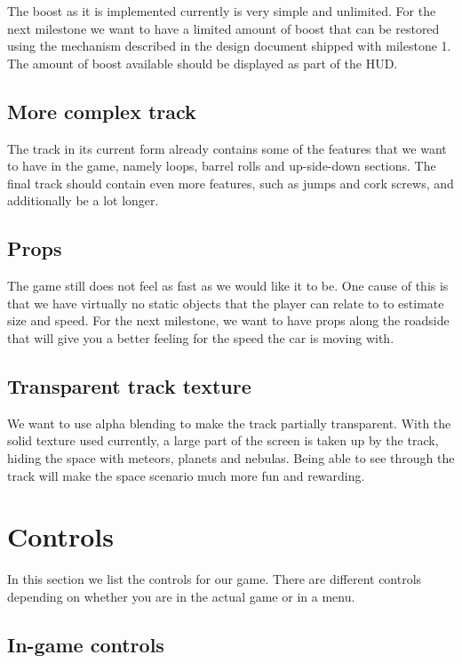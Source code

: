 \documentclass[11pt]{article}
\begin{document}
The boost as it is implemented currently is very simple and unlimited. For the next milestone we want to have a limited amount of boost that can be restored using the mechanism described in the design document shipped with milestone 1. The amount of boost available should be displayed as part of the HUD. 

\subsection{More complex track}

The track in its current form already contains some of the features that we want to have in the game, namely loops, barrel rolls and up-side-down sections. The final track should contain even more features, such as jumps and cork screws, and additionally be a lot longer.

\subsection{Props}

The game still does not feel as fast as we would like it to be. One cause of this is that we have virtually no static objects that the player can relate to to estimate size and speed. For the next milestone, we want to have props along the roadside that will give you a better feeling for the speed the car is moving with.

\subsection{Transparent track texture}

We want to use alpha blending to make the track partially transparent. With the solid texture used currently, a large part of the screen is taken up by the track, hiding the space with meteors, planets and nebulas. Being able to see through the track will make the space scenario much more fun and rewarding.

\appendix

\section{Controls}
\label{controls}

In this section we list the controls for our game. There are different controls
depending on whether you are in the actual game or in a menu. 

\subsection{In-game controls}
\end{document}
